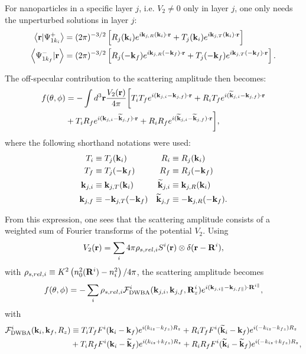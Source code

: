 For nanoparticles in a specific layer $j$, i.e. $V_2\neq0$ only in layer $j$, one only needs the unperturbed solutions in layer $j$:
\begin{align*}
  \left\langle \mathbf{r} \vert \Psi^+_{1k_i} \right\rangle &= (2\pi)^{-3/2}\left[ R_j(\mathbf{k}_i) e^{i \mathbf{k}_{j,R}(\mathbf{k}_i)\cdot\mathbf{r}} + T_j(\mathbf{k}_i) e^{i \mathbf{k}_{j,T}(\mathbf{k}_i)\cdot\mathbf{r}} \right] \\
  \left\langle \Psi^-_{1k_f} \vert \mathbf{r} \right\rangle &= (2\pi)^{-3/2}\left[ R_j(-\mathbf{k}_f) e^{i \mathbf{k}_{j,R}(-\mathbf{k}_f)\cdot\mathbf{r}} + T_j(-\mathbf{k}_f) e^{i \mathbf{k}_{j,T}(-\mathbf{k}_f)\cdot\mathbf{r}} \right].
\end{align*}

The off-specular contribution to the scattering amplitude then becomes:
\begin{align*}
  f(\theta, \phi) &= -\int d^3\mathbf{r} \frac{V_2(\mathbf{r})}{4\pi} \biggl[ T_iT_fe^{i(\mathbf{k}_{j,i}-\mathbf{k}_{j,f})\cdot\mathbf{r}} + R_iT_fe^{i(\mathbf{\widetilde{k}}_{j,i}-\mathbf{k}_{j,f})\cdot\mathbf{r}} \\
   & + T_iR_fe^{i(\mathbf{k}_{j,i}-\mathbf{\widetilde{k}}_{j,f})\cdot\mathbf{r}} + R_iR_fe^{i(\mathbf{\widetilde{k}}_{j,i}-\mathbf{\widetilde{k}}_{j,f})\cdot\mathbf{r}} \biggr],
\end{align*}
where the following shorthand notations were used:
\begin{align*}
  T_i &\equiv  T_j(\mathbf{k}_i) & R_i &\equiv  R_j(\mathbf{k}_i)  \\
  T_f &\equiv  T_j(-\mathbf{k}_f) & R_f &\equiv  R_j(-\mathbf{k}_f) \\
  \mathbf{k}_{j,i} &\equiv \mathbf{k}_{j,T}(\mathbf{k}_i) & \mathbf{\widetilde{k}}_{j,i} &\equiv \mathbf{k}_{j,R}(\mathbf{k}_i)  \\
  \mathbf{k}_{j,f} &\equiv -\mathbf{k}_{j,T}(-\mathbf{k}_f) & \mathbf{\widetilde{k}}_{j,f} &\equiv -\mathbf{k}_{j,R}(-\mathbf{k}_f).
\end{align*}

From this expression, one sees that the scattering amplitude consists of a weighted sum of Fourier transforms of the potential $V_2$. Using
\begin{equation*}
  V_2(\mathbf{r}) = \sum_i 4\pi \rho_{s,rel,i} S^i(\mathbf{r}) \otimes \delta(\mathbf{r} - \mathbf{R}^i),
\end{equation*}
with $\rho_{s,rel,i}\equiv  K^2\left( n_0^2(\mathbf{R}^i) - n_i^2 \right)/4\pi$, the scattering amplitude becomes
\begin{equation*}
  f(\theta, \phi) = -\sum_i  \rho_{s,rel,i} \mathcal{F}^i_{\text{DWBA}}(\mathbf{k}_{j,i},\mathbf{k}_{j,f},\mathbf{R}^i_z)e^{i(\mathbf{k}_{j,i\parallel}-\mathbf{k}_{j,f\parallel})\cdot \mathbf{R}^{i\parallel} },
\end{equation*}
with
\begin{align*}
  \mathcal{F}^i_\text{DWBA}(\mathbf{k}_i,\mathbf{k}_f,R_z) & \equiv T_iT_fF^i(\mathbf{k}_i-\mathbf{k}_f)e^{i(k_{iz}-k_{fz})R_z} + R_iT_fF^i(\mathbf{\widetilde{k}}_i-\mathbf{k}_f)e^{i(-k_{iz}-k_{fz})R_z} \\
  & + T_iR_fF^i(\mathbf{k}_i-\mathbf{\widetilde{k}}_f)e^{i(k_{iz}+k_{fz})R_z} + R_iR_fF^i(\mathbf{\widetilde{k}}_i-\mathbf{\widetilde{k}}_f)e^{i(-k_{iz}+k_{fz})R_z},
\end{align*}

